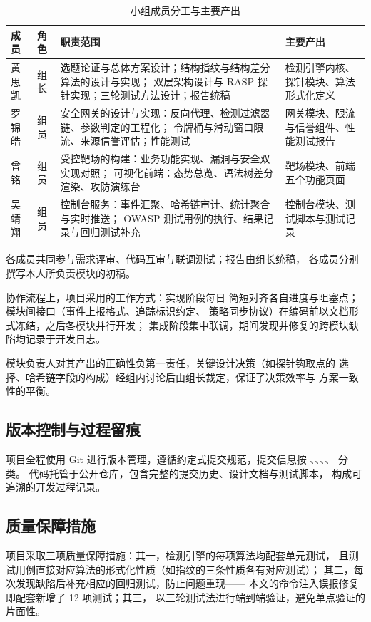 \begin{table}[htbp]
\centering
\caption{小组成员分工与主要产出}
\label{tab:team-roles}
\footnotesize
\begin{threeparttable}
\begin{tabular}{@{}l l p{5.6cm} p{3.6cm}@{}}
\toprule
\textbf{成员} & \textbf{角色} & \textbf{职责范围} & \textbf{主要产出} \\
\midrule
黄思凯 & 组长 &
  选题论证与总体方案设计；结构指纹与结构差分算法的设计与实现；
  双层架构设计与 RASP 探针实现；三轮测试方法设计；报告统稿 &
  检测引擎内核、探针模块、算法形式化定义 \\
\midrule
罗锦皓 & 组员 &
  安全网关的设计与实现：反向代理、检测过滤器链、参数判定的工程化；
  令牌桶与滑动窗口限流、来源信誉评估；性能测试 &
  网关模块、限流与信誉组件、性能测试报告 \\
\midrule
曾铭 & 组员 &
  受控靶场的构建：业务功能实现、漏洞与安全双实现对照；
  可视化前端：态势总览、语法树差分渲染、攻防演练台 &
  靶场模块、前端五个功能页面 \\
\midrule
吴靖翔 & 组员 &
  控制台服务：事件汇聚、哈希链审计、统计聚合与实时推送；
  OWASP 测试用例的执行、结果记录与回归测试补充 &
  控制台模块、测试脚本与测试记录 \\
\bottomrule
\end{tabular}
\begin{tablenotes}[flushleft]\footnotesize
\item 各成员共同参与需求评审、代码互审与联调测试；报告由组长统稿，
各成员分别撰写本人所负责模块的初稿。
\end{tablenotes}
\end{threeparttable}
\end{table}

协作流程上，项目采用的工作方式：实现阶段每日
简短对齐各自进度与阻塞点；模块间接口（事件上报格式、追踪标识约定、
策略同步协议）在编码前以文档形式冻结，之后各模块并行开发；
集成阶段集中联调，期间发现并修复的跨模块缺陷均记录于开发日志。

模块负责人对其产出的正确性负第一责任，关键设计决策（如探针钩取点的
选择、哈希链字段的构成）经组内讨论后由组长裁定，保证了决策效率与
方案一致性的平衡。

\subsection{版本控制与过程留痕}

项目全程使用 Git 进行版本管理，遵循约定式提交规范，提交信息按
、、、、 分类。
代码托管于公开仓库，包含完整的提交历史、设计文档与测试脚本，
构成可追溯的开发过程记录。

\subsection{质量保障措施}

项目采取三项质量保障措施：其一，检测引擎的每项算法均配套单元测试，
且测试用例直接对应算法的形式化性质（如指纹的三条性质各有对应测试）；
其二，每次发现缺陷后补充相应的回归测试，防止问题重现——
本文的命令注入误报修复即配套新增了 12 项测试；其三，
以三轮测试法进行端到端验证，避免单点验证的片面性。
